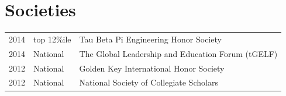 \documentclass[a4paper]{deedy-resume} %
\begin{document}
\begin{minipage}[t]{0.66\textwidth}
\sectionspace %


\section{Societies} 

\begin{tabular}{rll}
2014 & top 12\%ile & Tau Beta Pi Engineering Honor Society\\
2014 & National & The Global Leadership and Education Forum (tGELF)\\
2012 & National & Golden Key International Honor Society\\
2012 & National & National Society of Collegiate Scholars\\
\end{tabular}

\sectionspace %


\end{minipage} %








\end{document}
